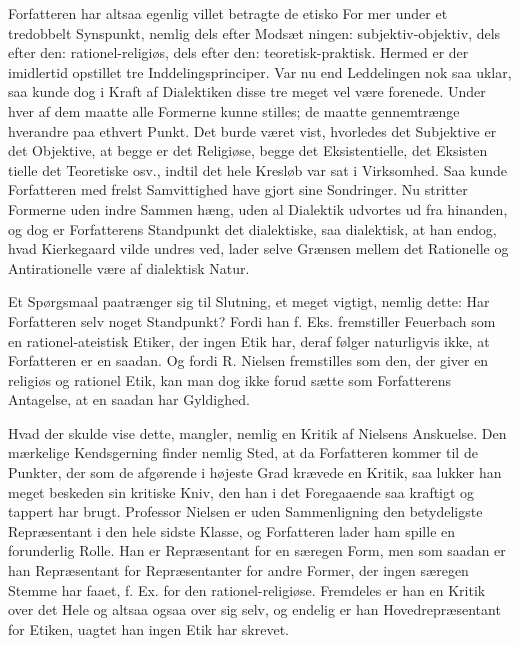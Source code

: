 \documentclass[12pt,a4paper,openany]{book}
\newcommand{\opage}[1]{\marginnote{\footnotesize\textit{[#1]}}}
\begin{document}
Forfatteren har altsaa egenlig villet betragte de etisko For\-%
mer under et tredobbelt Synspunkt, nemlig dels efter Modsæt\-%
ningen: subjektiv-objektiv, dels efter den: rationel-religiøs, dels
efter den: teoretisk-praktisk. Hermed er der imidlertid opstillet
tre Inddelingsprinciper. Var nu end Leddelingen nok saa
uklar, saa kunde dog i Kraft af Dialektiken disse tre meget vel
være forenede. Under hver af dem maatte alle Formerne kunne
\opage{32}stilles; de maatte gennemtrænge hverandre paa ethvert Punkt.
Det burde været vist, hvorledes det Subjektive er det Objektive,
at begge er det Religiøse, begge det Eksistentielle, det Eksisten\-%
tielle det Teoretiske osv., indtil det hele Kresløb var sat i
Virksomhed. Saa kunde Forfatteren med frelst Samvittighed have
gjort sine Sondringer. Nu stritter Formerne uden indre Sammen\-%
hæng, uden al Dialektik udvortes ud fra hinanden, og dog er
Forfatterens Standpunkt det dialektiske, saa dialektisk, at han
endog, hvad Kierkegaard vilde undres ved, lader selve Grænsen
mellem det Rationelle og Antirationelle være af dialektisk Natur.

Et Spørgsmaal paatrænger sig til Slutning, et meget vigtigt,
nemlig dette: Har Forfatteren selv noget Standpunkt? Fordi han
f. Eks. fremstiller Feuerbach som en rationel-ateistisk Etiker,
der ingen Etik har, deraf følger naturligvis ikke, at Forfatteren
er en saadan. Og fordi R. Nielsen fremstilles som den, der
giver en religiøs og rationel Etik, kan man dog ikke forud\-%
sætte som Forfatterens Antagelse, at en saadan har Gyldighed.

Hvad der skulde vise dette, mangler, nemlig en Kritik af
Nielsens Anskuelse. Den mærkelige Kendsgerning finder nemlig
Sted, at da Forfatteren kommer til de Punkter, der som de
afgørende i højeste Grad krævede en Kritik, saa lukker han
meget beskeden sin kritiske Kniv, den han i det Foregaaende
saa kraftigt og tappert har brugt. Professor Nielsen er uden
Sammenligning den betydeligste Repræsentant i den hele sidste
Klasse, og Forfatteren lader ham spille en forunderlig Rolle.
Han er Repræsentant for en særegen Form, men som saadan er
han Repræsentant for Repræsentanter for andre Former, der
ingen særegen Stemme har faaet, f. Ex. for den rationel-religiøse.
Fremdeles er han en Kritik over det Hele og altsaa ogsaa over
sig selv, og endelig er han Hovedrepræsentant for Etiken, uagtet
han ingen Etik har skrevet.
\end{document}
